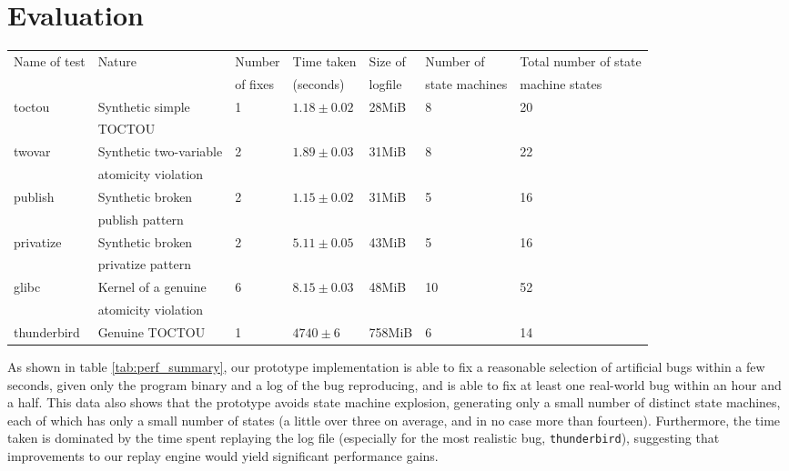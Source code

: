 \documentclass[10pt,twocolumn,preprint,natbib,authoryear]{sigplanconf}
\begin{document}
\section{Evaluation}
\label{sect:evaluation}

\begin{table*}
\begin{tabular}{lllllll}
Name of test & Nature & Number & Time taken & Size of & Number of & Total number of state\\
 & & of fixes & (seconds) & logfile & state machines & machine states\\
\hline
toctou & Synthetic simple & 1 & $1.18 \pm 0.02$ & 28MiB & 8 & 20\\
       & TOCTOU & & & \\
twovar & Synthetic two-variable & 2 & $1.89 \pm 0.03$ & 31MiB & 8 & 22\\
       & atomicity violation &&&\\
publish & Synthetic broken & 2 & $1.15 \pm 0.02$ & 31MiB & 5 & 16 \\
        & publish pattern & & & \\
privatize & Synthetic broken & 2 & $5.11 \pm 0.05$ & 43MiB & 5 & 16 \\
          & privatize pattern & & & \\
\hline
glibc & Kernel of a genuine & 6 & $8.15 \pm 0.03$ & 48MiB & 10 & 52\\
      & atomicity violation & & & \\
\hline
thunderbird & Genuine TOCTOU & 1 & $4740 \pm 6$ & 758MiB & 6 & 14
\end{tabular}
\caption{Summary of results obtained from running the fix generating
  tool on a single log file collected from each bug.  Timing
  information is mean and standard deviation from five runs.}
\label{tab:perf_summary}
\end{table*}

As shown in table \ref{tab:perf_summary}, our prototype implementation
is able to fix a reasonable selection of artificial bugs within a few
seconds, given only the program binary and a log of the bug
reproducing, and is able to fix at least one real-world bug within an
hour and a half.  This data also shows that the prototype avoids state
machine explosion, generating only a small number of distinct state
machines, each of which has only a small number of states (a little
over three on average, and in no case more than fourteen).
Furthermore, the time taken is dominated by the time spent replaying
the log file (especially for the most realistic bug,
\verb|thunderbird|), suggesting that improvements to our replay engine
would yield significant performance gains.
\end{document}

